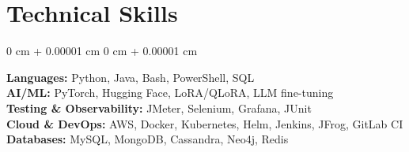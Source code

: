 \documentclass[10pt, letterpaper]{article}
\newenvironment{onecolentry}{
    \begin{adjustwidth}{
        0 cm + 0.00001 cm
    }{
        0 cm + 0.00001 cm
    }
}{
    \end{adjustwidth}
} %
\begin{document}
\vspace{-0.2cm}

  \section{Technical Skills}
  \begin{onecolentry}
      \textbf{Languages:} Python, Java, Bash, PowerShell, SQL \\
      \textbf{AI/ML:} PyTorch, Hugging Face, LoRA/QLoRA, LLM fine-tuning \\
      \textbf{Testing \& Observability:} JMeter, Selenium, Grafana, JUnit \\
      \textbf{Cloud \& DevOps:} AWS, Docker, Kubernetes, Helm, Jenkins, JFrog, GitLab CI \\
      \textbf{Databases:} MySQL, MongoDB, Cassandra, Neo4j, Redis
  \end{onecolentry}
\end{document}
